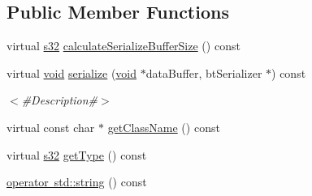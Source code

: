 \subsection*{Public Member Functions}
\begin{DoxyCompactItemize}
\item 
virtual \mbox{\hyperlink{_util_8h_aa62c75d314a0d1f37f79c4b73b2292e2}{s32}} \mbox{\hyperlink{classnjli_1_1_node_state_machine_a623987a0f43198b70aa9373d758a5afe}{calculate\+Serialize\+Buffer\+Size}} () const
\item 
virtual \mbox{\hyperlink{_thread_8h_af1e856da2e658414cb2456cb6f7ebc66}{void}} \mbox{\hyperlink{classnjli_1_1_node_state_machine_a3e6ef26c17f22a3f7c4e03fc651f82ad}{serialize}} (\mbox{\hyperlink{_thread_8h_af1e856da2e658414cb2456cb6f7ebc66}{void}} $\ast$data\+Buffer, bt\+Serializer $\ast$) const
\begin{DoxyCompactList}\small\item\em $<$\#\+Description\#$>$ \end{DoxyCompactList}\item 
virtual const char $\ast$ \mbox{\hyperlink{classnjli_1_1_node_state_machine_a2b3063546fe0cadb8fa59006b9f68913}{get\+Class\+Name}} () const
\item 
virtual \mbox{\hyperlink{_util_8h_aa62c75d314a0d1f37f79c4b73b2292e2}{s32}} \mbox{\hyperlink{classnjli_1_1_node_state_machine_a5d31328eae2661bf79eeddac3f614dbe}{get\+Type}} () const
\item 
\mbox{\hyperlink{classnjli_1_1_node_state_machine_ac645b2b1a8f2b937babd496031809ab7}{operator std\+::string}} () const
\end{DoxyCompactItemize}
